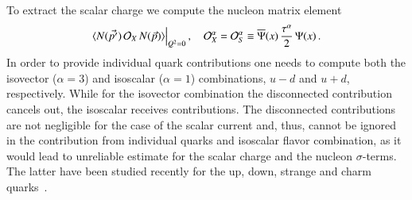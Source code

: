 \documentclass[epj]{webofc}
\newcommand{\be}{\begin{equation}}
\newcommand{\ee}{\end{equation}}
\begin{document}
To extract the scalar charge we compute the nucleon matrix element
\be
\langle N(\vec{p'}) \, \mathcal{O}_X \, N(\vec{p}) \rangle \Big{|}_{Q^2=0} \,, \quad 
\mathcal{O}^\alpha_X = \mathcal{O}^\alpha_S \equiv \overline{\Psi}(x)\,\frac{\tau^\alpha}{2}\, \Psi(x)\,.
\ee
In order to provide individual quark contributions one needs to compute both the isovector ($\alpha{=}3$) and
isoscalar ($\alpha{=}1$) combinations, $u{-}d$ and $u{+}d$, respectively. While for the isovector combination the disconnected
contribution cancels out, the isoscalar receives contributions. The disconnected contributions are not negligible for the case of the 
scalar current and, thus, cannot be ignored in the contribution from individual quarks and isoscalar flavor combination, as it would 
lead to unreliable estimate for the scalar charge and the nucleon $\sigma$-terms. The latter have
been studied recently for the up, down, strange and charm quarks~\cite{Yang:2015uis,Abdel-Rehim:2016won,Bali:2016lvx}.
\end{document}
